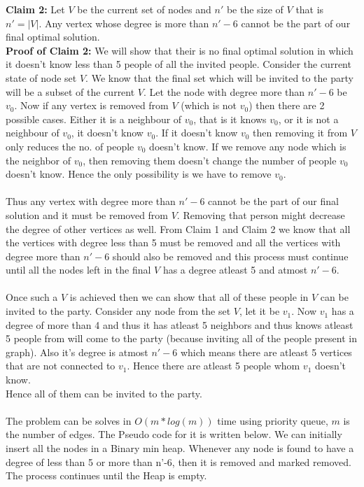 \documentclass{article}
\begin{document}
\textbf{Claim 2:} Let $V$ be the current set of nodes and $n'$ be the size of $V$ that is $n'= |V|$. Any vertex whose degree is more than $n'-6$ cannot be the part of our final optimal solution.\\
\textbf{Proof of Claim 2:} We will show that their is no final optimal solution in which it doesn't know less than 5 people of all the invited people. Consider the current state of node set $V$. We know that the final set which will be invited to the party will be a subset of the current $V$. Let the node with degree more than $n'-6$ be $v_0$. Now if any vertex is removed from $V$ (which is not $v_0$) then there are 2 possible cases. Either it is a neighbour of $v_0$, that is it knows $v_0$, or it is not a neighbour of $v_0$, it doesn't know $v_0$. If it doesn't know $v_0$ then removing it from $V$ only reduces the no. of people $v_0$ doesn't know. If we remove any node which is the neighbor of $v_0$, then removing them doesn't change the number of people $v_0$ doesn't know. Hence the only possibility is we have to remove $v_0$.
\\\\
Thus any vertex with degree more than $n'-6$ cannot be the part of our final solution and it must be removed from $V$. Removing that person might decrease the degree of other vertices as well. From Claim 1 and Claim 2 we know that all the vertices with degree less than 5 must be removed and all the vertices with degree more than $n'-6$ should also be removed and this process must continue until all the nodes left in the final $V$ has a degree atleast 5 and atmost $n'-6$. 
\\\\
Once such a $V$ is achieved then we can show that all of these people in $V$ can be invited to the party. Consider any node from the set $V$, let it be $v_1$. Now $v_1$ has a degree of more than 4 and thus it has atleast 5 neighbors and thus knows atleast 5 people from will come to the party (because inviting all of the people present in graph). Also it's degree is atmost $n'-6$ which means there are atleast 5 vertices that are not connected to $v_1$. Hence there are atleast 5 people whom $v_1$ doesn't know.\\Hence all of them can be invited to the party.
\\\\
The problem can be solves in $O(m*log(m))$ time using priority queue, $m$ is the number of edges. The Pseudo code for it is written below. We can initially insert all the nodes in a Binary min heap. Whenever any node is found to have a degree of less than 5 or more than n'-6, then it is removed and marked removed. The process continues until the Heap is empty.
\end{document}

